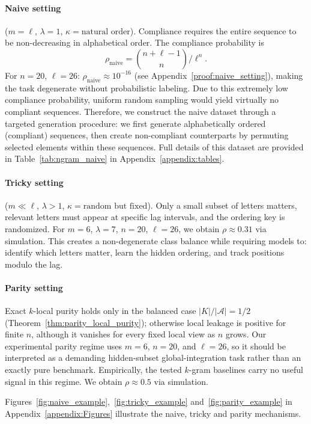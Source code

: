 \documentclass{article}
\theoremstyle{plain}
\theoremstyle{definition}
\theoremstyle{remark}
\begin{document}
\paragraph{Naive setting} ($m = \ell$, $\lambda = 1$, $\kappa = \text{natural order}$).
\label{paragraph:naive_setting}
Compliance requires the entire sequence to be non-decreasing in alphabetical order. The compliance probability is
\[
\rho_{\mathrm{naive}} = \binom{n+\ell-1}{n} \big/ \ell^n.
\]
For $n=20$, $\ell=26$: $\rho_{\mathrm{naive}} \approx 10^{-16}$ (see Appendix~\ref{proof:naive_setting}), making the task degenerate without probabilistic labeling. Due to this extremely low compliance probability, uniform random sampling would yield virtually no compliant sequences. Therefore, we construct the naive dataset through a targeted generation procedure: we first generate alphabetically ordered (compliant) sequences, then create non-compliant counterparts by permuting selected elements within these sequences. Full details of this dataset are provided in Table~\ref{tab:ngram_naive} in Appendix~\ref{appendix:tables}.


\paragraph{Tricky setting} ($m \ll \ell$, $\lambda > 1$, $\kappa = \text{random but fixed}$).
Only a small subset of letters matters, relevant letters must appear at specific lag intervals, and the ordering key is randomized. For $m=6$, $\lambda=7$, $n=20$, $\ell=26$, we obtain $\rho \approx 0.31$ via simulation. This creates a non-degenerate class balance while requiring models to: identify which letters matter, learn the hidden ordering, and track positions modulo the lag.

\paragraph{Parity setting}
Exact $k$-local purity holds only in the balanced case
$|K|/|\mathcal{A}| = 1/2$
(Theorem~\ref{thm:parity_local_purity});
otherwise local leakage is positive for finite $n$, although it vanishes for
every fixed local view as $n$ grows. Our experimental parity regime uses
$m=6$, $n=20$, and $\ell=26$, so it should be interpreted as a demanding
hidden-subset global-integration task rather than an exactly pure benchmark.
Empirically, the tested $k$-gram baselines carry no useful signal in this
regime. We obtain $\rho \approx 0.5$ via simulation.

Figures~\ref{fig:naive_example},~\ref{fig:tricky_example} and~\ref{fig:parity_example} in Appendix~\ref{appendix:Figures} illustrate the naive, tricky and parity mechanisms.
\end{document}
